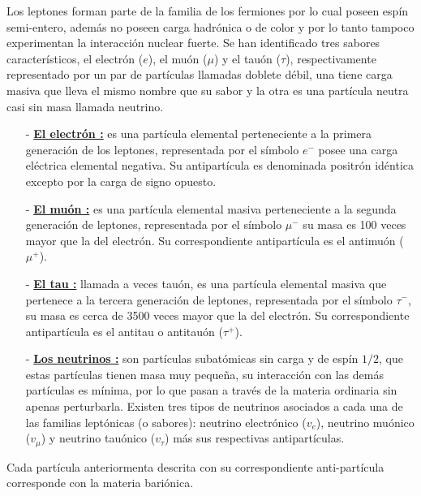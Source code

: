 Los leptones forman parte de la familia de los fermiones por lo cual poseen espín semi-entero, además no poseen carga hadrónica o de color y por lo tanto tampoco experimentan la interacción nuclear fuerte. Se han identificado tres sabores característicos, el electrón ($e$), el muón ($\mu$) y el tauón ($\tau$), respectivamente representado por un par de partículas llamadas doblete débil, una tiene carga masiva que lleva el mismo nombre que su sabor y la otra es una partícula neutra casi sin masa llamada neutrino.
\begin{itemize}

\item[-] \href{https://es.wikipedia.org/wiki/Electr\%C3\%B3n}{\textbf{El electrón :}} es una partícula elemental perteneciente a la primera generación de los leptones, representada por el símbolo $e^-$ posee una carga eléctrica elemental negativa. Su antipartícula es denominada positrón idéntica excepto por la carga de signo opuesto.

\item[-] \href{https://es.wikipedia.org/wiki/Muon}{\textbf{El muón :}} 
 es una partícula elemental masiva perteneciente a la segunda generación de leptones, representada por el símbolo $\mu^-$ su masa es 100 veces mayor que la del electrón. Su correspondiente antipartícula es el antimuón ($\mu^+$).

\item[-] \href{https://es.wikipedia.org/wiki/Tau_(part\%C3\%ADcula)}{\textbf{El tau :}} llamada a veces tauón, es una partícula elemental masiva que pertenece a la tercera generación de leptones, representada por el símbolo $\tau^-$, su masa es cerca de 3500 veces mayor que la del electrón. Su correspondiente antipartícula es el antitau o antitauón ($\tau^+$).

\item[-] \href{https://es.wikipedia.org/wiki/Neutrino}{\textbf{Los neutrinos :}}
son partículas subatómicas sin carga y de espín $1/2$, que estas partículas tienen masa muy pequeña, su interacción con las demás partículas es mínima, por lo que pasan a través de la materia ordinaria sin apenas perturbarla. Existen tres tipos de neutrinos asociados a cada una de las familias leptónicas (o sabores): neutrino electrónico ($v_e$), neutrino muónico ($v_\mu$) y neutrino tauónico ($v_\tau$) más sus respectivas antipartículas.

\end{itemize}

Cada partícula anteriormenta descrita con su correspondiente anti-partícula corresponde con la materia bari\'onica.
























